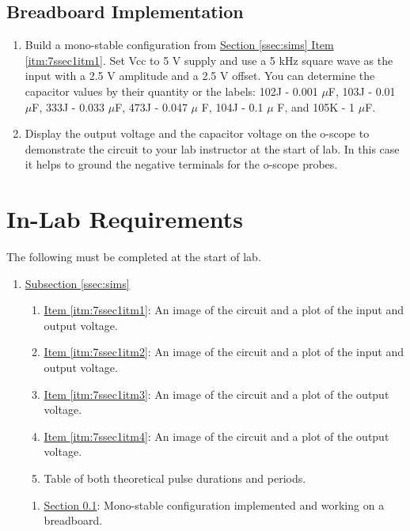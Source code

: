 \subsection{Breadboard Implementation} \label{ssec:breadboard}

\begin{enumerate}
	\item Build a mono-stable configuration  from \hyperref[itm:7ssec1itm1]{Section \ref*{ssec:sims} Item \ref*{itm:7ssec1itm1}}. Set Vcc to 5 V supply and use a 5 kHz square wave as the input with a 2.5 V amplitude and a 2.5 V offset. You can determine the capacitor values by their quantity or the labels: 102J - 0.001 $\mu$F, 103J - 0.01 $\mu$F, 333J - 0.033 $\mu$F, 473J - 0.047 $\mu$ F, 104J - 0.1 $\mu$ F, and 105K - 1 $\mu$F.
	\item Display the output voltage and the capacitor voltage on the o-scope to demonstrate the circuit to your lab instructor at the start of lab. In this case it helps to ground the negative terminals for the o-scope probes. 
\end{enumerate}

\section{In-Lab Requirements}

The following must be completed at the start of lab. 

\begin{enumerate}
	\item \hyperref[ssec:sims]{Subsection \ref*{ssec:sims}}
		\begin{enumerate} 
			\item \hyperref[itm:7ssec1itm1]{Item \ref*{itm:7ssec1itm1}}: An image of the circuit and a plot of the input and output voltage.
			\item \hyperref[itm:7ssec1itm2]{Item \ref*{itm:7ssec1itm2}}: An image of the circuit and a plot of the input and output voltage.
			\item \hyperref[itm:7ssec1itm3]{Item \ref*{itm:7ssec1itm3}}: An image of the circuit and a plot of the output voltage.
			\item \hyperref[itm:7ssec1itm4]{Item \ref*{itm:7ssec1itm4}}: An image of the circuit and a plot of the output voltage.
			\item Table of both theoretical pulse durations and periods. 
		\end{enumerate}
		\begin{enumerate}
			\item \hyperref[ssec:breadboard]{Section \ref*{ssec:breadboard}}: Mono-stable configuration implemented and working on a breadboard. 
		\end{enumerate}

\end{enumerate}

